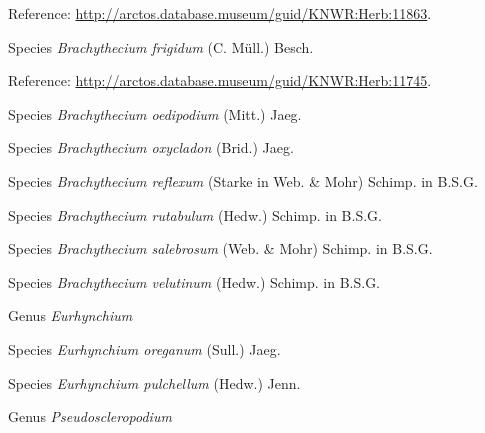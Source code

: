\documentclass[9pt, article]{memoir}
\begin{document}
\begin{multicols}{2}
\vspace{6pt}Reference: 
\url{http://arctos.database.museum/guid/KNWR:Herb:11863}.

\vspace{6pt}\noindent\hspace{36pt}Species \textit{Brachythecium frigidum} (C. Müll.) Besch.


\vspace{6pt}Reference: 
\url{http://arctos.database.museum/guid/KNWR:Herb:11745}.

\vspace{6pt}\noindent\hspace{36pt}Species \textit{Brachythecium oedipodium} (Mitt.) Jaeg.


\vspace{6pt}\noindent\hspace{36pt}Species \textit{Brachythecium oxycladon} (Brid.) Jaeg.


\vspace{6pt}\noindent\hspace{36pt}Species \textit{Brachythecium reflexum} (Starke in Web. \& Mohr) Schimp. in B.S.G.


\vspace{6pt}\noindent\hspace{36pt}Species \textit{Brachythecium rutabulum} (Hedw.) Schimp. in B.S.G.


\vspace{6pt}\noindent\hspace{36pt}Species \textit{Brachythecium salebrosum} (Web. \& Mohr) Schimp. in B.S.G.


\vspace{6pt}\noindent\hspace{36pt}Species \textit{Brachythecium velutinum} (Hedw.) Schimp. in B.S.G.


\vspace{6pt}\noindent\hspace{30pt}Genus \textit{Eurhynchium}


\vspace{6pt}\noindent\hspace{36pt}Species \textit{Eurhynchium oreganum} (Sull.) Jaeg.


\vspace{6pt}\noindent\hspace{36pt}Species \textit{Eurhynchium pulchellum} (Hedw.) Jenn.


\vspace{6pt}\noindent\hspace{30pt}Genus \textit{Pseudoscleropodium}



\end{multicols}
\end{document}
